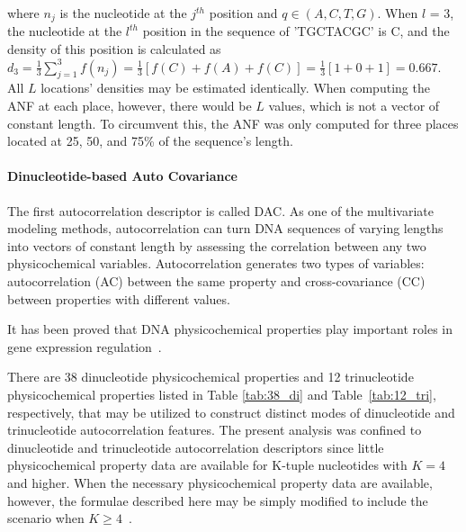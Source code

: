 where $n_{j}$ is the nucleotide at the $j^{th}$ position and $q \in (A,C,T,G)$. When $l$ = 3, the nucleotide at the $l^{th}$ position in the sequence of 'TGCTACGC' is C, and the density of this position is calculated as $d_{3} = \frac{1}{3}\sum_{j=1}^{3}f(n_{j}) = \frac{1}{3} [f(C) + f(A) + f(C)] = \frac{1}{3} [1+0+1] = 0.667$. All $L$ locations' densities may be estimated identically. When computing the \gls{ANF} at each place, however, there would be $L$ values, which is not a vector of constant length. To circumvent this, the \gls{ANF} was only computed for three places located at 25, 50, and 75\% of the sequence's length.

\paragraph{Dinucleotide-based Auto Covariance}

The first autocorrelation descriptor is called \gls{DAC}. As one of the multivariate modeling methods, autocorrelation can turn \gls{DNA} sequences of varying lengths into vectors of constant length by assessing the correlation between any two physicochemical variables. Autocorrelation generates two types of variables: autocorrelation (AC) between the same property and cross-covariance (CC) between properties with different values.

It has been proved that \gls{DNA} physicochemical properties play important roles in gene expression regulation~\cite{Brukner1995Sequence-dependentTrinucleotides.,Fukue2005ARelevance}. 

There are 38 dinucleotide physicochemical properties and 12 trinucleotide physicochemical properties listed in Table \ref{tab:38_di} and Table~\ref{tab:12_tri}, respectively, that may be utilized to construct distinct modes of dinucleotide and trinucleotide autocorrelation features. The present analysis was confined to dinucleotide and trinucleotide autocorrelation descriptors since little physicochemical property data are available for K-tuple nucleotides with $K = 4$ and higher. When the necessary physicochemical property data are available, however, the formulae described here may be simply modified to include the scenario when $K \geq 4$~\cite{Chen2014PseKNC:Composition}.


